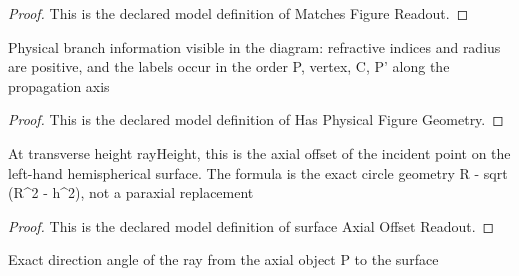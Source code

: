\begin{proof}
  This is the declared model definition of Matches Figure Readout.
\end{proof}
\begin{definition}
  \label{def:physics:phyx-mini-0040:phyxminiproblems-problemphyxmini0040-hasphysicalfiguregeometry}
  Physical branch information visible in the diagram: refractive indices and radius are positive, and the labels occur in the order P, vertex, C, P' along the propagation axis
\end{definition}
\begin{proof}
  This is the declared model definition of Has Physical Figure Geometry.
\end{proof}
\begin{definition}
  \label{def:physics:phyx-mini-0040:phyxminiproblems-problemphyxmini0040-surfaceaxialoffsetreadout}
  At transverse height rayHeight, this is the axial offset of the incident point on the left-hand hemispherical surface. The formula is the exact circle geometry R - sqrt (R\textasciicircum{}2 - h\textasciicircum{}2), not a paraxial replacement
\end{definition}
\begin{proof}
  This is the declared model definition of surface Axial Offset Readout.
\end{proof}
\begin{definition}
  \label{def:physics:phyx-mini-0040:phyxminiproblems-problemphyxmini0040-incidentrayangle}
  Exact direction angle of the ray from the axial object P to the surface
\end{definition}
